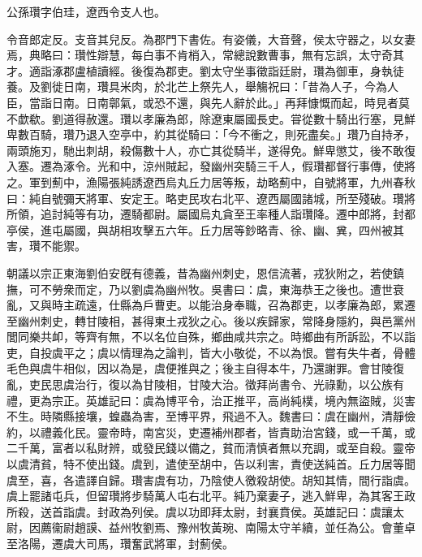 
\begin{pinyinscope}
公孫瓚字伯珪，遼西令支人也。

令音郎定反。支音其兒反。為郡門下書佐。有姿儀，大音聲，侯太守器之，以女妻焉，典略曰：瓚性辯慧，每白事不肯梢入，常總說數曹事，無有忘誤，太守奇其才。適詣涿郡盧植讀經。後復為郡吏。劉太守坐事徵詣廷尉，瓚為御車，身執徒養。及劉徙日南，瓚具米肉，於北芒上祭先人，舉觴祝曰：「昔為人子，今為人臣，當詣日南。日南鄣氣，或恐不還，與先人辭於此。」再拜慷慨而起，時見者莫不歔欷。劉道得赦還。瓚以孝廉為郎，除遼東屬國長史。甞從數十騎出行塞，見鮮卑數百騎，瓚乃退入空亭中，約其從騎曰：「今不衝之，則死盡矣。」瓚乃自持矛，兩頭施刃，馳出刺胡，殺傷數十人，亦亡其從騎半，遂得免。鮮卑懲艾，後不敢復入塞。遷為涿令。光和中，涼州賊起，發幽州突騎三千人，假瓚都督行事傳，使將之。軍到薊中，漁陽張純誘遼西烏丸丘力居等叛，劫略薊中，自號將軍，九州春秋曰：純自號彌天將軍、安定王。略吏民攻右北平、遼西屬國諸城，所至殘破。瓚將所領，追討純等有功，遷騎都尉。屬國烏丸貪至王率種人詣瓚降。遷中郎將，封都亭侯，進屯屬國，與胡相攻擊五六年。丘力居等鈔略青、徐、幽、兾，四州被其害，瓚不能禦。

朝議以宗正東海劉伯安旣有德義，昔為幽州刺史，恩信流著，戎狄附之，若使鎮撫，可不勞衆而定，乃以劉虞為幽州牧。吳書曰：虞，東海恭王之後也。遭世衰亂，又與時主疏遠，仕縣為戶曹吏。以能治身奉職，召為郡吏，以孝廉為郎，累遷至幽州刺史，轉甘陵相，甚得東土戎狄之心。後以疾歸家，常降身隱約，與邑黨州閭同樂共卹，等齊有無，不以名位自殊，鄉曲咸共宗之。時鄉曲有所訴訟，不以詣吏，自投虞平之；虞以情理為之論判，皆大小敬從，不以為恨。嘗有失牛者，骨體毛色與虞牛相似，因以為是，虞便推與之；後主自得本牛，乃還謝罪。會甘陵復亂，吏民思虞治行，復以為甘陵相，甘陵大治。徵拜尚書令、光祿勳，以公族有禮，更為宗正。英雄記曰：虞為博平令，治正推平，高尚純樸，境內無盜賊，災害不生。時隣縣接壤，蝗蟲為害，至博平界，飛過不入。魏書曰：虞在幽州，清靜儉約，以禮義化民。靈帝時，南宮災，吏遷補州郡者，皆責助治宮錢，或一千萬，或二千萬，富者以私財辨，或發民錢以備之，貧而清慎者無以充調，或至自殺。靈帝以虞清貧，特不使出錢。虞到，遣使至胡中，告以利害，責使送純首。丘力居等聞虞至，喜，各遣譯自歸。瓚害虞有功，乃陰使人徼殺胡使。胡知其情，間行詣虞。虞上罷諸屯兵，但留瓚將步騎萬人屯右北平。純乃棄妻子，逃入鮮卑，為其客王政所殺，送首詣虞。封政為列侯。虞以功即拜太尉，封襄賁侯。英雄記曰：虞讓太尉，因薦衞尉趙謨、益州牧劉焉、豫州牧黃琬、南陽太守羊續，並任為公。會董卓至洛陽，遷虞大司馬，瓚奮武將軍，封薊侯。


\end{pinyinscope}
